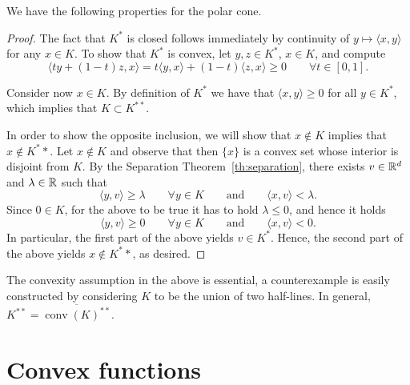  We 	have the following properties for the polar cone.
 
 
 \begin{proof}
     The fact that $K^*$ is closed follows immediately by continuity of $y\mapsto \langle x,y\rangle$ for any $x\in K$.
     To show that $K^*$ is convex, let $y,z\in K^*$, $x\in K$, and compute
     \begin{equation}
         \langle ty + (1-t)z, x\rangle = t \langle y, x\rangle +(1-t) \langle z,x\rangle \ge 0 \qquad \forall t\in [0,1].
     \end{equation}
 
     Consider now $x\in K$. By definition of $K^*$ we have that $\langle x,y\rangle\ge 0$ for all $y\in K^*$, which implies that $K\subset K^{**}$.
 
     In order to show the opposite inclusion, we will show that $x\notin K$ implies that $x\notin K^**$. Let $x\notin K$ and observe that then $\{x\}$ is a convex set whose interior is disjoint from $K$. By the Separation Theorem~\ref{th:separation}, there exists $v\in \mathbb{R}^d$ and $\lambda\in\mathbb{R}$ such that
     \begin{equation}
         \langle y,v \rangle\ge  \lambda\qquad \forall y\in K
         \qquad\text{and}\qquad
         \langle x,v \rangle < \lambda.
     \end{equation}
     Since $0\in K$, for the above to be true it has to hold $\lambda \le 0$, and hence it holds
     \begin{equation}
         \langle y,v \rangle\ge  0\qquad \forall y\in K
         \qquad\text{and}\qquad
         \langle x,v \rangle < 0.
     \end{equation}
     In particular, the first part of the above yields $v\in K^*$. Hence, the second part of the above yields $x\notin K^**$, as desired.
 \end{proof}
 
 \begin{remark}
     The convexity assumption in the above is essential, a counterexample is easily constructed by considering $K$ to be the union of two half-lines.
     In general, $K^{**} = \overline{\operatorname{conv}(K)^{**}}$.
 \end{remark}
 
 \section{Convex functions}
 
